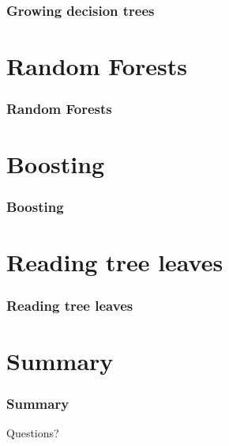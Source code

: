 \documentclass{beamer}
\begin{document}
\begin{frame}
  \frametitle{Growing decision trees}
\end{frame}




\section{Random Forests}

\begin{frame}
  \frametitle{Random Forests}
\end{frame}




\section{Boosting}

\begin{frame}
  \frametitle{Boosting}
\end{frame}




\section{Reading tree leaves}

\begin{frame}
  \frametitle{Reading tree leaves}
\end{frame}






\section{Summary}

\begin{frame}
  \frametitle{Summary}
\end{frame}

\begin{frame}
\begin{center}
{\Huge  Questions?}
\end{center}
\end{frame}
\end{document}
